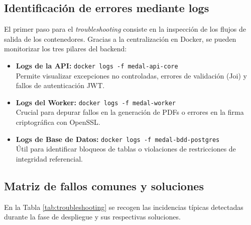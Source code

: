 \documentclass[12pt,a4paper]{report}
\begin{document}
\subsection{Identificación de errores mediante logs}

El primer paso para el \textit{troubleshooting} consiste en la inspección de los flujos de salida de los contenedores. Gracias a la centralización en Docker, se pueden monitorizar los tres pilares del backend:

\begin{itemize}
    \item \textbf{Logs de la API:} \texttt{docker logs -f medal-api-core} 
    \\ Permite visualizar excepciones no controladas, errores de validación (Joi) y fallos de autenticación JWT.
    \item \textbf{Logs del Worker:} \texttt{docker logs -f medal-worker} 
    \\ Crucial para depurar fallos en la generación de PDFs o errores en la firma criptográfica con OpenSSL.
    \item \textbf{Logs de Base de Datos:} \texttt{docker logs -f medal-bdd-postgres} 
    \\ Útil para identificar bloqueos de tablas o violaciones de restricciones de integridad referencial.
\end{itemize}

\subsection{Matriz de fallos comunes y soluciones}

En la Tabla \ref{tab:troubleshooting} se recogen las incidencias típicas detectadas durante la fase de despliegue y sus respectivas soluciones.
\end{document}
